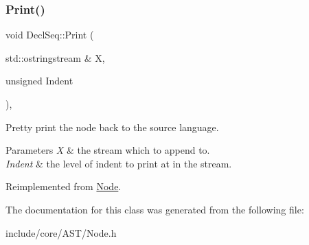 \mbox{\label{class_decl_seq_a028dc9916d5ab8369117d90b9e7af7f8}} 
\subsubsection{\texorpdfstring{Print()}{Print()}}
{\footnotesize\ttfamily void Decl\+Seq\+::\+Print (\begin{DoxyParamCaption}\item[{std\+::ostringstream \&}]{X,  }\item[{unsigned}]{Indent }\end{DoxyParamCaption})\hspace{0.3cm}{\ttfamily [override]}, {\ttfamily [virtual]}}

Pretty print the node back to the source language. 
\begin{DoxyParams}{Parameters}
{\em X} & the stream which to append to. \\
\hline
{\em Indent} & the level of indent to print at in the stream. \\
\hline
\end{DoxyParams}


Reimplemented from \mbox{\hyperlink{class_node_a5325b760a6e6fe94227c0cff53af2c45}{Node}}.



The documentation for this class was generated from the following file\+:\begin{DoxyCompactItemize}
\item 
include/core/\+A\+S\+T/Node.\+h\end{DoxyCompactItemize}
